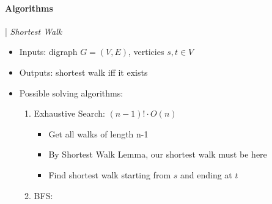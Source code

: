 \documentclass{article}
\begin{document}
\paragraph*{Algorithms} |
\newline
\newline
\emph{Shortest Walk}
\begin{itemize}
  \item Inputs: digraph $G = (V,E)$, verticies $s,t \in V$ 
  \item Outputs: shortest walk iff it exists
  \item Possible solving algorithms:
  \begin{enumerate}
    \item Exhaustive Search: $(n-1)! \cdot O(n)$
    \begin{itemize}
      \item Get all walks of length n-1
      \item By Shortest Walk Lemma, our shortest walk must be here
      \item Find shortest walk starting from $s$ and ending at $t$
    \end{itemize}
    \item BFS: 
  \end{enumerate}
\end{itemize}
\end{document}
